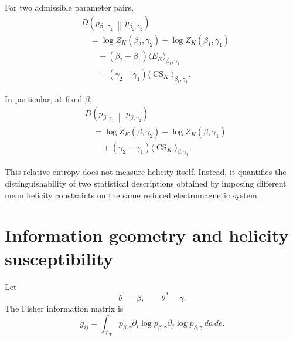 \documentclass[11pt]{article}
\theoremstyle{definition}
\theoremstyle{remark}
\newcommand{\CS}{\operatorname{CS}}
\begin{document}
For two admissible parameter pairs,
\begin{align}
&D\left(
p_{\beta_1,\gamma_1}
\,\middle\|\,
p_{\beta_2,\gamma_2}
\right)
\nonumber\\
&\quad=
\log Z_K(\beta_2,\gamma_2)
-
\log Z_K(\beta_1,\gamma_1)
\nonumber\\
&\qquad+
(\beta_2-\beta_1)
\langle E_K\rangle_{\beta_1,\gamma_1}
\nonumber\\
&\qquad+
(\gamma_2-\gamma_1)
\langle\CS_K\rangle_{\beta_1,\gamma_1}.
\label{eq:full-relative}
\end{align}

In particular, at fixed \(\beta\),
\begin{align}
&D\left(
p_{\beta,\gamma_1}
\,\middle\|\,
p_{\beta,\gamma_2}
\right)
\nonumber\\
&\quad=
\log Z_K(\beta,\gamma_2)
-
\log Z_K(\beta,\gamma_1)
\nonumber\\
&\qquad+
(\gamma_2-\gamma_1)
\langle\CS_K\rangle_{\beta,\gamma_1}.
\label{eq:fixed-relative}
\end{align}

This relative entropy does not measure helicity itself.
Instead, it quantifies the distinguishability of two
statistical descriptions obtained by imposing different mean
helicity constraints on the same reduced electromagnetic
system.

\section{Information geometry and helicity susceptibility}

Let
\begin{equation}
\theta^1=\beta,
\qquad
\theta^2=\gamma.
\end{equation}
The Fisher information matrix is
\begin{equation}
g_{ij}
=
\int_{\mathcal P_{\mathrm T}}
p_{\beta,\gamma}
\partial_i\log p_{\beta,\gamma}
\partial_j\log p_{\beta,\gamma}
\,da\,de.
\label{eq:fisher}
\end{equation}
\end{document}
